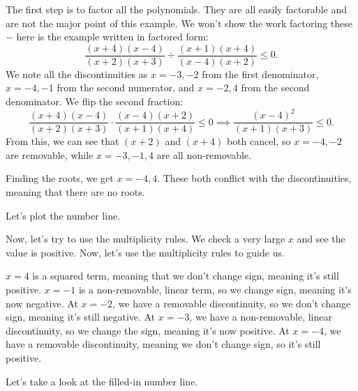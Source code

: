 \documentclass[lang=en,11pt]{elegantbook}
\begin{document}
\begin{solution}
The first step is to factor all the polynomials.  They are all easily factorable and are not the major point of this example.  We won't show the work factoring these $-$ here is the example written in factored form:
$$\dfrac{(x+4)(x-4)}{(x+2)(x+3)}\div\dfrac{(x+1)(x+4)}{(x-4)(x+2)}\leq 0.$$
We note all the discontinuities as $x=-3,-2$ from the first denominator, $x=-4,-1$ from the second numerator, and $x=-2,4$ from the second denominator.  We flip the second fraction: $$\dfrac{(x+4)(x-4)}{(x+2)(x+3)}\cdot\dfrac{(x-4)(x+2)}{(x+1)(x+4)}\leq 0 \implies \dfrac{(x-4)^2}{(x+1)(x+3)}\leq 0.$$
From this, we can see that $(x+2)$ and $(x+4)$ both cancel, so $x=-4,-2$ are removable, while $x=-3,-1,4$ are all non-removable.

Finding the roots, we get $x=-4,4$.  These both conflict with the discontinuities, meaning that there are no roots.

Let's plot the number line.

\begin{figure}[!h]
    \centering
\end{figure}

Now, let's try to use the multiplicity rules.  We check a very large $x$ and see the value is positive.  Now, let's use the multiplicity rules to guide us.

$x=4$ is a squared term, meaning that we don't change sign, meaning it's still positive.  $x=-1$ is a non-removable, linear term, so we change sign, meaning it's now negative. At $x=-2$, we have a removable discontinuity, so we don't change sign, meaning it's still negative.  At $x=-3$, we have a non-removable, linear discontinuity, so we change the sign, meaning it's now positive.  At $x=-4$, we have a removable discontinuity, meaning we don't change sign, so it's still positive.

Let's take a look at the filled-in number line.


\end{solution}
\end{document}
